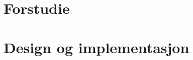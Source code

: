 \documentclass[11pt, a4paper]{report}
\newcommand{\comment}[1]{} \comment{This is a block comment wrapped in curly brackets}
\begin{document}



%
%

\tableofcontents
\newpage
{}






\comment{ foreløpig struktur på rapport:
Sammendrag
Innhold
Introduksjon
	Gruppen
	Initiativet
	Problemet
	Ideen
Pre study
	Mekanikk
	Hardware
	Software
Markedsundersøkelse
	generelt
	4 p'er
Løsning
	valg av løsning
	hardware
	software
		GUI
	diskusjon
Konklusjon
Referanseliste
Vedlegg
}


\chapter{Forstudie}
	
	
	
	
%
\chapter{Design og implementasjon}
%
%
%


\newpage
{}
\listoftables
{}
\listoffigures
{}



%
\end{document}
